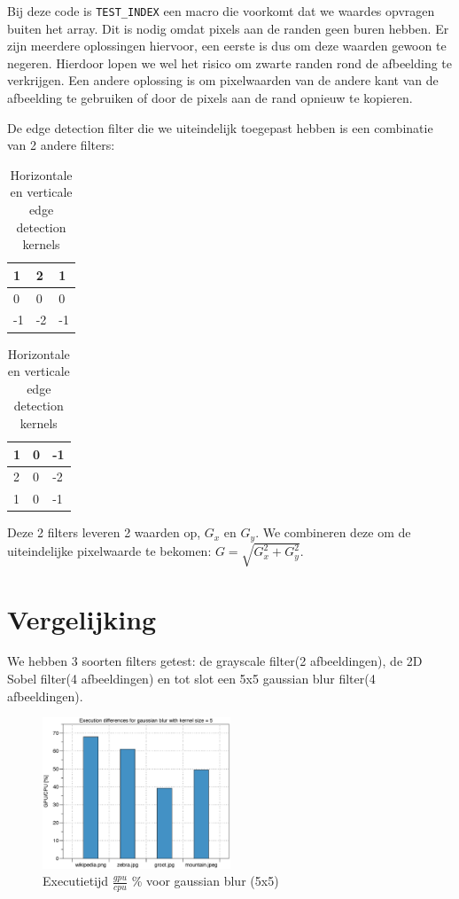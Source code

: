 \documentclass[10pt, twocolumn, a4paper]{article}
\begin{document}
Bij deze code is \texttt{TEST_INDEX} een macro die voorkomt dat we waardes opvragen buiten het array. Dit is nodig omdat pixels aan de randen geen buren hebben. Er zijn meerdere oplossingen hiervoor, een eerste is dus om deze waarden gewoon te negeren. Hierdoor lopen we wel het risico om zwarte randen rond de afbeelding te verkrijgen. Een andere oplossing is om pixelwaarden van de andere kant van de afbeelding te gebruiken of door de pixels aan de rand opnieuw te kopieren. 

De edge detection filter die we uiteindelijk toegepast hebben is een combinatie van 2 andere filters:

\begin{table}[H]
    \centering
    \begin{tabular}{|l|l|l|}
        \hline
        1 & 2 & 1 \\ \hline
        0 & 0 & 0 \\ \hline
        -1 & -2 & -1 \\
        \hline
    \end{tabular}
    \begin{tabular}{|l|l|l|}
        \hline
        1 & 0 & -1 \\ \hline
        2 & 0 & -2 \\ \hline
        1 & 0 & -1 \\
        \hline
    \end{tabular}
    \caption{Horizontale en verticale edge detection kernels}
\end{table}

Deze 2 filters leveren 2 waarden op, $G_x$ en $G_y$. We combineren deze om de uiteindelijke pixelwaarde te bekomen: $G = \sqrt{G_x^2 + G_y^2 }$. 

\section{Vergelijking}

We hebben 3 soorten filters getest: de grayscale filter(2 afbeeldingen), de 2D Sobel filter(4 afbeeldingen) en tot slot een 5x5 gaussian blur filter(4 afbeeldingen). 



\begin{figure}[H]
    \centering
    \includegraphics[width=0.5\textwidth]{gaussian_blur.eps}
    \caption{Executietijd $\frac{gpu}{cpu}$ \% voor gaussian blur (5x5)}
    \label{blocksize}
\end{figure}
\end{document}
